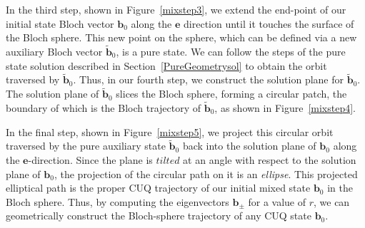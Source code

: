 \documentclass[12pt,a4paper]{article}
\begin{document}
In the third step, shown in Figure~\ref{mixstep3}, we extend the end-point of our initial state Bloch vector $\mathbf{b}_0$ along the $\mathbf{e}$ direction until it touches the surface of the Bloch sphere. This new point on the sphere, which can be defined via a new auxiliary Bloch vector $\mathbf{\widetilde{b}}_0$, is a pure state. We can follow the steps of the pure state solution described in Section~\ref{PureGeometrysol} to obtain the orbit traversed by $\mathbf{\widetilde{b}}_0$. Thus, in our fourth step, we construct the solution plane for $\mathbf{\widetilde{b}}_0$. The solution plane of $\mathbf{\widetilde{b}}_0$ slices the Bloch sphere, forming a circular patch, the boundary of which is the Bloch trajectory of $\mathbf{\widetilde{b}}_0$, as shown in Figure~\ref{mixstep4}. 

In the final step, shown in Figure~\ref{mixstep5}, we project this circular orbit traversed by the pure auxiliary state $\mathbf{\widetilde{b}}_0$ back into the solution plane of $\mathbf{b}_0$ along the $\mathbf{e}$-direction. Since the plane is $\textit{tilted}$ at an angle with respect to the solution plane of $\mathbf{b}_0$, the projection of the circular path on it is an {\em ellipse}. This projected elliptical path is the proper CUQ trajectory of our initial mixed state $\mathbf{b}_0$ in the Bloch sphere. Thus, by computing the eigenvectors $\mathbf{b}_\pm$ for a value of $r$, we can geometrically construct the Bloch-sphere trajectory of any CUQ state $\mathbf{b}_0$. 
\end{document}
